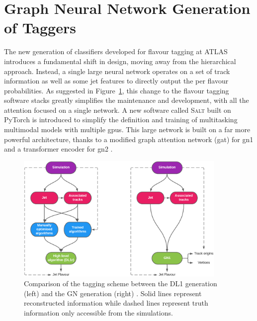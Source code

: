 \section{Graph Neural Network Generation of Taggers}\label{chap:GN}
The new generation of classifiers developed for flavour tagging at ATLAS introduces a fundamental shift in design, moving away from the hierarchical approach. Instead, a single large neural network operates on a set of track information as well as some jet features to directly output the per flavour probabilities. As suggested in Figure~\ref{fig:ftagArchi}, this change to the flavour tagging software stacks greatly simplifies the maintenance and development, with all the attention focused on a single network. A new software called \textsc{Salt} \cite{SaltCite} built on PyTorch \cite{pytorch} is introduced to simplify the definition and training of multitasking multimodal models with multiple \glspl{gpu}. This large network is built on a far more powerful architecture, thanks to a modified graph attention network (\gls{gat}) \cite{velickovic2018graph, brody2022how} for \gls{gn1} and a transformer encoder for \gls{gn2} \cite{NIPS_transformerPaper}. 

\begin{figure}[h!]
  \center
  \includegraphics[width=0.9\textwidth]{Images/FTAG/GN/Intro/schematics_difference.png}
  \caption{Comparison of the tagging scheme between the DL1 generation (left) and the GN generation (right) \cite{ATL-PHYS-PUB-2022-027}. Solid lines represent reconstructed information while dashed lines represent truth information only accessible from the simulations.} 
  \label{fig:ftagArchi}
\end{figure}

